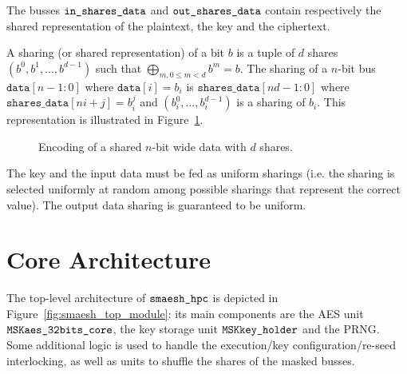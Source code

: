 \documentclass{scrartcl}
\begin{document}
The busses $\texttt{in\_shares\_data}$ and
$\texttt{out\_shares\_data}$ contain respectively the shared representation of the
plaintext, the key and the ciphertext.

A sharing (or shared representation) of a bit $b$ is a tuple of $d$ shares
$\left(b^0, b^1, \dots, b^{d-1} \right)$ such that $\bigoplus_{m,0\leq m<d} b^m = b$.
The sharing of a $n$-bit bus
$\texttt{data}\left[ n-1:0\right]$ where $\texttt{data}[i]=b_i$
is
$\texttt{shares\_data}\left[ nd-1:0 \right]$ where
$\texttt{shares\_data}\left[ ni+j\right] = b_i^j$ and
$\left(b_i^0, \dots, b_i^{d-1}\right)$ is a sharing of $b_i$.
This representation is illustrated in Figure~\ref{fig:encoding}.

\begin{figure}
    \centering
    \resizebox{\textwidth}{!}{
        \begin{tikzpicture}
            
        \end{tikzpicture}
    }
    \caption{Encoding of a shared $n$-bit wide data with $d$ shares.}
    \label{fig:encoding}
\end{figure}

The key and the input data must be fed as uniform sharings (i.e. the sharing is
selected uniformly at random among possible sharings that represent the correct
value). The output data sharing is guaranteed to be uniform.

\section{Core Architecture}
\label{section:architecture}

The top-level architecture of $\texttt{smaesh\_hpc}$ is depicted in Figure~\ref{fig:smaesh_top_module}:
its main components are the AES unit $\texttt{MSKaes\_32bits\_core}$, the key storage unit $\texttt{MSKkey\_holder}$ and the PRNG. Some additional logic
is used to handle the execution/key configuration/re-seed interlocking, as well as units to shuffle
the shares of the masked busses.
\end{document}
